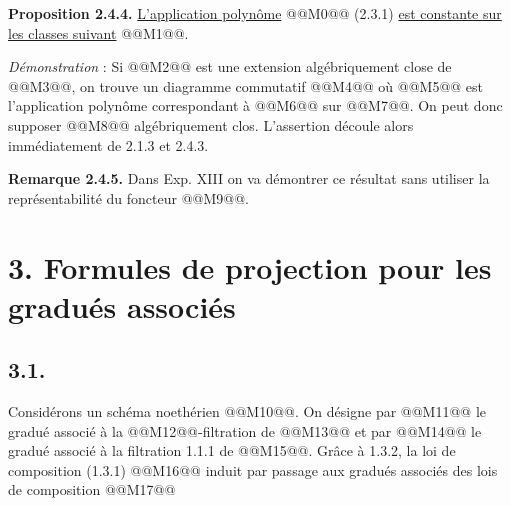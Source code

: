 
\textbf{Proposition 2.4.4.} \uline{L'application polynôme} @@M0@@ (2.3.1) \uline{est constante sur les classes suivant} @@M1@@.

\emph{Démonstration} : Si @@M2@@ est une extension algébriquement close de @@M3@@, on trouve un diagramme commutatif
@@M4@@
où @@M5@@ est l'application polynôme correspondant à @@M6@@ sur @@M7@@. On peut donc supposer @@M8@@ algébriquement clos. L'assertion découle alors immédiatement de 2.1.3 et 2.4.3.

\textbf{Remarque 2.4.5.} Dans Exp. XIII on va démontrer ce résultat sans utiliser la représentabilité du foncteur @@M9@@.

\section*{3. Formules de projection pour les gradués associés}

\subsection*{3.1.}
Considérons un schéma noethérien @@M10@@. On désigne par @@M11@@ le gradué associé à la @@M12@@-filtration de @@M13@@ et par @@M14@@ le gradué associé à la filtration 1.1.1 de @@M15@@. Grâce à 1.3.2, la loi de composition (1.3.1)
@@M16@@
induit par passage aux gradués associés des lois de composition
@@M17@@
